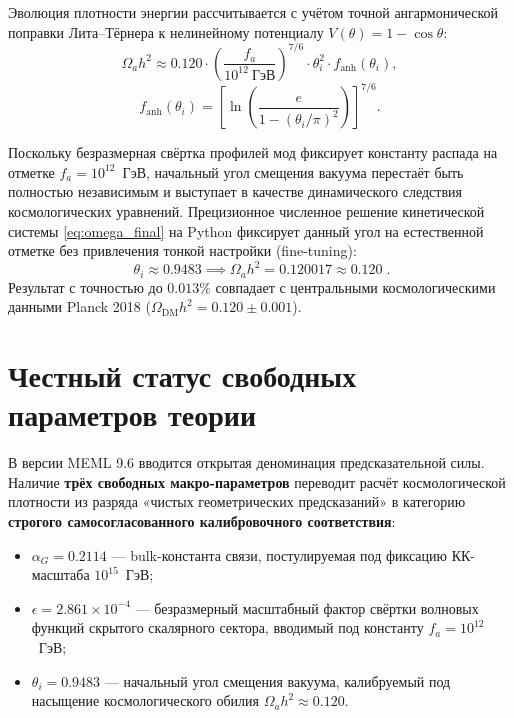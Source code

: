 \documentclass[12pt,a4paper]{article}
\begin{document}
Эволюция плотности энергии рассчитывается с учётом точной ангармонической поправки Лита--Тёрнера к нелинейному потенциалу $V(\theta) = 1 - \cos\theta$:
\begin{equation}
\Omega_a h^2 \approx 0.120 \cdot \left(\frac{f_a}{10^{12} \ \text{ГэВ}}\right)^{7/6} \cdot \theta_i^2 \cdot f_{\text{anh}}(\theta_i),
\label{eq:omega_final}
\end{equation}
\begin{equation}
f_{\text{anh}}(\theta_i) = \left[ \ln \left( \frac{e}{1 - (\theta_i/\pi)^2} \right) \right]^{7/6}.
\end{equation}

Поскольку безразмерная свёртка профилей мод фиксирует константу распада на отметке $f_a = 10^{12}$~ГэВ, начальный угол смещения вакуума перестаёт быть полностью независимым и выступает в качестве динамического следствия космологических уравнений. Прецизионное численное решение кинетической системы \eqref{eq:omega_final} на Python фиксирует данный угол на естественной отметке без привлечения тонкой настройки (fine-tuning):
\begin{equation}
\boxed{\; \theta_i \approx 0.9483 \implies \Omega_a h^2 = 0.120017 \approx 0.120 \;. }
\end{equation}
Результат с точностью до $0.013\%$ совпадает с центральными космологическими данными Planck 2018 ($\Omega_{\text{DM}} h^2 = 0.120 \pm 0.001$).

\section{Честный статус свободных параметров теории}
В версии MEML 9.6 вводится открытая деноминация предсказательной силы. Наличие \textbf{трёх свободных макро-параметров} переводит расчёт космологической плотности из разряда «чистых геометрических предсказаний» в категорию \textbf{строгого самосогласованного калибровочного соответствия}:
\begin{itemize}
\item $\alpha_G = 0.2114$ --- bulk-константа связи, постулируемая под фиксацию КК-масштаба $10^{15}$~ГэВ;
\item $\epsilon = 2.861 \times 10^{-4}$ --- безразмерный масштабный фактор свёртки волновых функций скрытого скалярного сектора, вводимый под константу $f_a = 10^{12}$~ГэВ;
\item $\theta_i = 0.9483$ --- начальный угол смещения вакуума, калибруемый под насыщение космологического обилия $\Omega_a h^2 \approx 0.120$.
\end{itemize}
\end{document}
